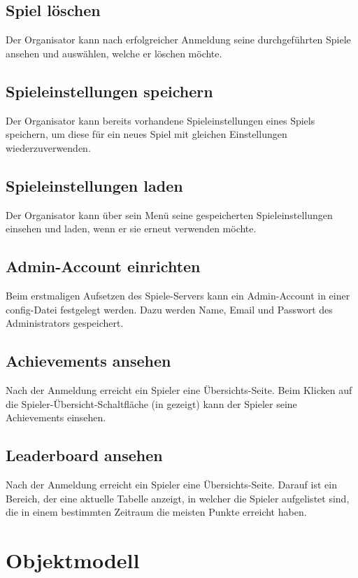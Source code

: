 \documentclass[a4paper]{scrreprt}
\begin{document}
    \subsection{Spiel löschen}
    Der \Gls{Organisator} kann nach erfolgreicher Anmeldung seine durchgeführten Spiele ansehen und
    auswählen, welche er löschen möchte.

    \subsection{Spieleinstellungen speichern}
    Der \Gls{Organisator} kann bereits vorhandene Spieleinstellungen eines Spiels speichern, um diese
    für ein neues Spiel mit gleichen Einstellungen wiederzuverwenden.

    \subsection{Spieleinstellungen laden}
    Der \Gls{Organisator} kann über sein Menü seine gespeicherten Spieleinstellungen einsehen und laden, wenn
    er sie erneut verwenden möchte.

    \subsection{Admin-Account einrichten}
    Beim erstmaligen Aufsetzen des \Gls{Spiele-Server}s kann ein Admin-Account in einer config-Datei festgelegt werden.
    Dazu werden Name, Email und Passwort des \Gls{Administrator}s gespeichert.

    \subsection{Achievements ansehen}
    Nach der Anmeldung erreicht ein \Gls{Spieler} eine Übersichts-Seite. Beim Klicken auf die Spieler-Übersicht-Schaltfläche
    (in  gezeigt) kann der \Gls{Spieler} seine \Gls{Achievement}s einsehen.
    \subsection{Leaderboard ansehen}
    
    Nach der Anmeldung erreicht ein \Gls{Spieler} eine Übersichts-Seite. Darauf ist ein Bereich, der eine aktuelle Tabelle
    anzeigt, in welcher die \Gls{Spieler} aufgelistet sind, die in einem bestimmten Zeitraum die meisten Punkte erreicht haben.

    \section{Objektmodell}
\end{document}
